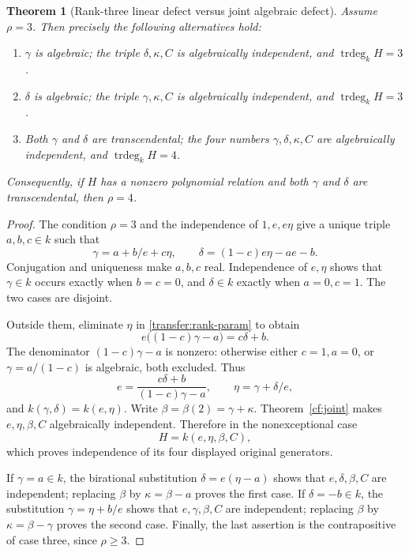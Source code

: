 \documentclass[11pt]{article}
\newtheorem{theorem}{Theorem}[section]
\theoremstyle{definition}
\theoremstyle{remark}
\begin{document}
\begin{theorem}[Rank-three linear defect versus joint algebraic defect]
\label{transfer:rank3}
Assume $\rho=3$. Then precisely the following alternatives hold:
\begin{enumerate}
\item $\gamma$ is algebraic; the triple $\delta,\kappa,C$ is algebraically
independent, and $\operatorname{trdeg}_k H=3$.
\item $\delta$ is algebraic; the triple $\gamma,\kappa,C$ is algebraically
independent, and $\operatorname{trdeg}_k H=3$.
\item Both $\gamma$ and $\delta$ are transcendental; the four numbers
$\gamma,\delta,\kappa,C$ are algebraically independent, and
$\operatorname{trdeg}_k H=4$.
\end{enumerate}
Consequently, if $H$ has a nonzero polynomial relation and both $\gamma$
and $\delta$ are transcendental, then $\rho=4$.
\end{theorem}
\begin{proof}
The condition $\rho=3$ and the independence of $1,e,e\eta$ give a unique
triple $a,b,c\in k$ such that
\begin{equation}\label{transfer:rank-param}
 \gamma=a+b/e+c\eta,\qquad
 \delta=(1-c)e\eta-ae-b.
\end{equation}
Conjugation and uniqueness make $a,b,c$ real. Independence of $e,\eta$
shows that $\gamma\in k$ occurs exactly when $b=c=0$, and
$\delta\in k$ exactly when $a=0,c=1$. The two cases are disjoint.

Outside them, eliminate $\eta$ in \eqref{transfer:rank-param} to obtain
\[
 e\bigl((1-c)\gamma-a\bigr)=c\delta+b.
\]
The denominator $(1-c)\gamma-a$ is nonzero: otherwise either $c=1,a=0$,
or $\gamma=a/(1-c)$ is algebraic, both excluded. Thus
\[
 e=\frac{c\delta+b}{(1-c)\gamma-a},\qquad
 \eta=\gamma+\delta/e,
\]
and $k(\gamma,\delta)=k(e,\eta)$. Write $\beta=\beta(2)=\gamma+\kappa$.
Theorem~\ref{cf:joint} makes $e,\eta,\beta,C$ algebraically independent. Therefore in the
nonexceptional case
\[
 H=k(e,\eta,\beta,C),
\]
which proves independence of its four displayed original generators.

If $\gamma=a\in k$, the birational substitution
$\delta=e(\eta-a)$ shows that $e,\delta,\beta,C$ are independent; replacing
$\beta$ by $\kappa=\beta-a$ proves the first case. If $\delta=-b\in k$, the
substitution $\gamma=\eta+b/e$ shows that $e,\gamma,\beta,C$ are independent;
replacing $\beta$ by $\kappa=\beta-\gamma$ proves the second case. Finally, the
last assertion is the contrapositive of case three, since $\rho\ge3$.
\end{proof}
\end{document}
